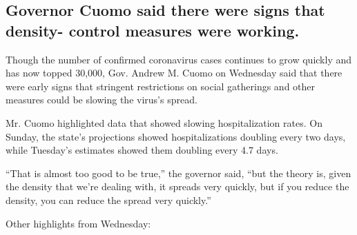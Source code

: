 \hypertarget{governor-cuomo-said-there-were-signs-that-density--control-measures-were-working}{%
\subsection{Governor Cuomo said there were signs that density- control
measures were
working.}\label{governor-cuomo-said-there-were-signs-that-density--control-measures-were-working}}

Though the number of confirmed coronavirus cases continues to grow
quickly and has now topped 30,000, Gov. Andrew M. Cuomo on Wednesday
said that there were early signs that stringent restrictions on social
gatherings and other measures could be slowing the virus's spread.

Mr. Cuomo highlighted data that showed slowing hospitalization rates. On
Sunday, the state's projections showed hospitalizations doubling every
two days, while Tuesday's estimates showed them doubling every 4.7 days.

``That is almost too good to be true,'' the governor said, ``but the
theory is, given the density that we're dealing with, it spreads very
quickly, but if you reduce the density, you can reduce the spread very
quickly.''

Other highlights from Wednesday:

